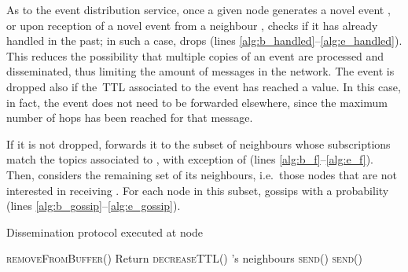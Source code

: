 \documentclass[10pt, conference, compsocconf]{IEEEtran}
\begin{document}
As to the event distribution service, once a given node  generates a novel event , or upon reception of a novel event  from a neighbour ,  checks if it has already handled  in the past; in such a case,  drops  (lines \ref{alg:b_handled}--\ref{alg:e_handled}). This reduces the possibility that multiple copies of an event are processed and disseminated, thus limiting the amount of messages in the network.
The event is dropped also if the~\ac{TTL} associated to the event has reached a  value. In this case, in fact, the event does not need to be forwarded elsewhere, since the maximum number of hops has been reached for that message. 

If  it is not dropped,  forwards it to the subset of neighbours 
whose subscriptions match the topics associated to , with exception of  (lines \ref{alg:b_f}--\ref{alg:e_f}).
Then,  considers the remaining set of its neighbours, i.e.~those nodes that are not interested in receiving .
For each node in this subset,  gossips  with a probability  (lines \ref{alg:b_gossip}--\ref{alg:e_gossip}).

\begin{algorithm}[t]
\caption{Dissemination protocol executed at node }
\label{alg:protocol}
\begin{small}
\begin{algorithmic}[1]
\STATE  \textsc{removeFromBuffer}()
 \label{alg:b_handled} 
  \STATE Return
\ENDIF \label{alg:e_handled}
\STATE \textsc{decreaseTTL}()
\STATE 's neighbours \hfill{} \label{alg:b_f}
\STATE 
\FORALL{} \hfill{}
  \STATE \textsc{send}()\ENDFOR \label{alg:e_f}
\FORALL{} \hfill{}\label{alg:b_gossip}
       \STATE \textsc{send}()\ENDIF \ENDFOR \label{alg:e_gossip}
\end{algorithmic}
\end{small}
\end{algorithm}
\end{document}
